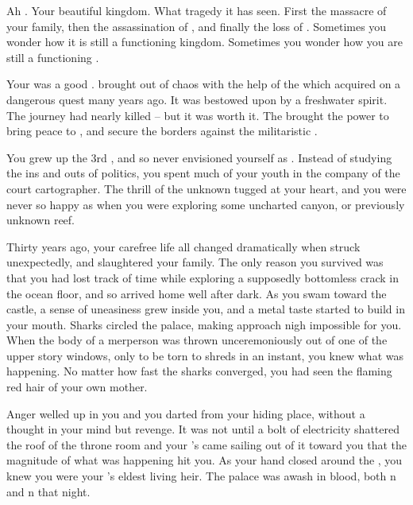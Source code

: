 \documentclass[char]{NeptuneBall}
\begin{document}
\name{\cKing{}}

Ah \pAtlantis{}. Your beautiful kingdom. What tragedy it has seen. First the massacre of your family, then the assassination of \cQueen{\King{}} \cQueen{}, and finally the loss of \cAriel{\Prince{}} \cAriel{}. Sometimes you wonder how it is still a functioning kingdom. Sometimes you wonder how you are still a functioning \cKing{\King{}}.

Your \cExKing{\parent{}} was a good \cExKing{\King{}}. \cExKing{\They{}} brought \pAtlantis{} out of chaos with the help of the \iTrident{\MYname{}} which \cExKing{\they{}} acquired on a dangerous quest many years ago. It was bestowed upon \cExKing{\them{}} by a freshwater spirit. The journey had nearly killed \cExKing{\them{}} -- but it was worth it. The \iTrident{\MYname{}} brought \cExKing{\MYname{}} the power to bring peace to \pAtlantis{}, and secure the borders against the militaristic \pPacifica{}.

You grew up the 3rd \cKing{\offspring{}}, and so never envisioned yourself as \cKing{\King{}}. Instead of studying the ins and outs of politics, you spent much of your youth in the company of the court cartographer. The thrill of the unknown tugged at your heart, and you were never so happy as when you were exploring some uncharted canyon, or previously unknown reef.

Thirty years ago, your carefree life all changed dramatically when \pPacifica{} struck unexpectedly, and slaughtered your family. The only reason you survived was that you had lost track of time while exploring a supposedly bottomless crack in the ocean floor, and so arrived home well after dark. As you swam toward the castle, a sense of uneasiness grew inside you, and a metal taste started to build in your mouth. Sharks circled the palace, making approach nigh impossible for you. When the body of a merperson was thrown unceremoniously out of one of the upper story windows, only to be torn to shreds in an instant, you knew what was happening. No matter how fast the sharks converged, you had seen the flaming red hair of your own mother.

Anger welled up in you and you darted from your hiding place, without a thought in your mind but revenge. It was not until a bolt of electricity shattered the roof of the throne room and your \cExKing{\parent{}}'s \iTrident{\MYname{}} came sailing out of it toward you that the magnitude of what was happening hit you. As your hand closed around the \iTrident{\MYname{}}, you knew you were your \cExKing{\parent{}}'s eldest living heir. The palace was awash in blood, both \pPacifica{}n and \pAtlantis{}n that night. 
\end{document}
